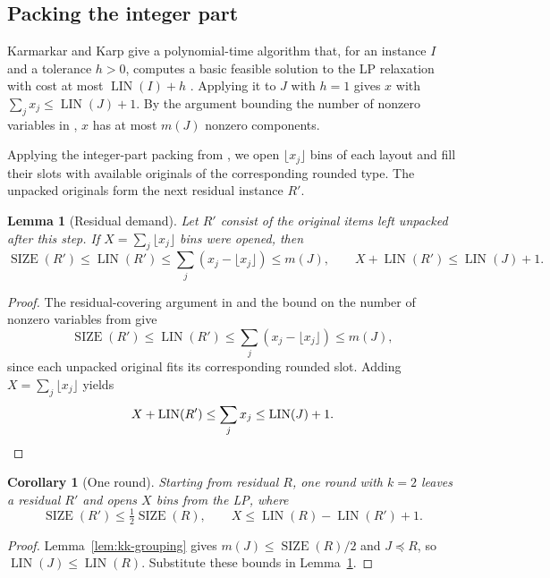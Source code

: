 \documentclass[11pt,a4paper,onecolumn]{article}
\theoremstyle{plain}
\newtheorem{lemma}[theorem]{Lemma}
\newtheorem{corollary}[theorem]{Corollary}
\theoremstyle{definition}
\theoremstyle{remark}
\DeclareMathOperator{\SIZE}{SIZE}
\DeclareMathOperator{\LIN}{LIN}
\begin{document}
\subsection{Packing the integer part}

Karmarkar and Karp give a polynomial-time algorithm that, for an
instance $I$ and a tolerance $h>0$, computes a basic feasible solution
to the LP relaxation with cost at most $\LIN(I)+h$
\cite[Theorem~1]{karmarkarEfficientApproximationScheme1982}.
Applying it to $J$ with $h=1$ gives $x$ with
$\sum_j x_j\le\LIN(J)+1$.
By the argument bounding the number of nonzero variables in
, $x$ has at most $m(J)$ nonzero components.

Applying the integer-part packing from ,
we open $\lfloor x_j\rfloor$ bins of each layout and fill their slots
with available originals of the corresponding rounded type.
The unpacked originals form the next residual instance $R'$.

\begin{lemma}[Residual demand]\label{lem:kk-residual}
Let $R'$ consist of the original items left unpacked after this step.
If $X=\sum_j\lfloor x_j\rfloor$ bins were opened, then
\[
  \SIZE(R')\le\LIN(R')
     \le \sum_j(x_j-\lfloor x_j\rfloor)\le m(J),
  \qquad X+\LIN(R')\le \LIN(J)+1 .
\]
\end{lemma}

\begin{proof}
The residual-covering argument in  and the bound
on the number of nonzero variables from 
give
\[
    \SIZE(R')\le\LIN(R')
    \le\sum_j(x_j-\lfloor x_j\rfloor)\le m(J),
\]
since each unpacked original fits its corresponding rounded slot.
Adding $X=\sum_j\lfloor x_j\rfloor$ yields
\[
    X+\LIN(R')\le\sum_j x_j\le\LIN(J)+1.\qedhere
\]
\end{proof}

\begin{corollary}[One round]\label{cor:kk-round}
Starting from residual $R$, one round with $k=2$ leaves a residual
$R'$ and opens $X$ bins from the LP, where
\[
  \SIZE(R')\le\tfrac12\SIZE(R),\qquad
  X\le\LIN(R)-\LIN(R')+1.
\]
\end{corollary}

\begin{proof}
Lemma~\ref{lem:kk-grouping} gives $m(J)\le\SIZE(R)/2$ and
$J\preceq R$, so $\LIN(J)\le\LIN(R)$. Substitute these bounds
in Lemma~\ref{lem:kk-residual}.
\end{proof}
\end{document}
